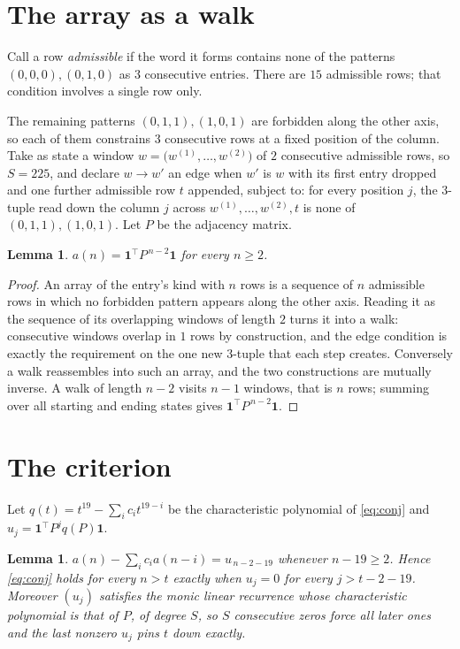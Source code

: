 \documentclass[11pt,a4paper]{article}
\theoremstyle{plain}
\newtheorem{lemma}[theorem]{Lemma}
\theoremstyle{definition}
\begin{document}
\section{The array as a walk}

Call a row \emph{admissible} if the word it forms contains none of the patterns
$(0,0,0), (0,1,0)$ as $3$ consecutive entries. There are $15$ admissible rows; that condition
involves a single row only.

The remaining patterns $(0,1,1), (1,0,1)$ are forbidden along the other axis, so each of them
constrains $3$ consecutive rows at a fixed position of the column. Take as state a
window $w=\bigl(w^{(1)},\dots,w^{(2)}\bigr)$ of $2$ consecutive admissible
rows, so $S=225$, and declare $w\to w'$ an edge when $w'$ is $w$ with its first entry
dropped and one further admissible row $t$ appended, subject to: for every position
$j$, the $3$-tuple read down the column $j$ across $w^{(1)},\dots,w^{(2)},t$
is none of $(0,1,1), (1,0,1)$. Let $P$ be the adjacency matrix.

\begin{lemma}\label{lem:walk}
$a(n)=\mathbf{1}^{\!\top}P^{\,n-2}\mathbf{1}$ for every $n\ge2$.
\end{lemma}

\begin{proof}
An array of the entry's kind with $n$ rows is a sequence of $n$ admissible rows in
which no forbidden pattern appears along the other axis. Reading it as the sequence of its
overlapping windows of length $2$ turns it into a walk: consecutive windows overlap in
$1$ rows by construction, and the edge condition is exactly the requirement on the one
new $3$-tuple that each step creates. Conversely a walk reassembles into such an array,
and the two constructions are mutually inverse. A walk of length $n-2$ visits $n-1$
windows, that is $n$ rows; summing over all starting and ending states gives
$\mathbf{1}^{\!\top}P^{\,n-2}\mathbf{1}$.
\end{proof}

\section{The criterion}

Let $q(t)=t^{19}-\sum_i c_i t^{19-i}$ be the characteristic polynomial of
\eqref{eq:conj} and $u_j=\mathbf{1}^{\!\top}P^{j}q(P)\mathbf{1}$.

\begin{lemma}\label{lem:crit}
$a(n)-\sum_i c_i a(n-i)=u_{\,n-2-19}$ whenever $n-19\ge2$. Hence
\eqref{eq:conj} holds for every $n>t$ exactly when $u_j=0$ for every
$j>t-2-19$. Moreover $(u_j)$ satisfies the monic linear recurrence whose
characteristic polynomial is that of $P$, of degree $S$, so $S$ consecutive zeros force all
later ones and the last nonzero $u_j$ pins $t$ down exactly.
\end{lemma}
\end{document}
